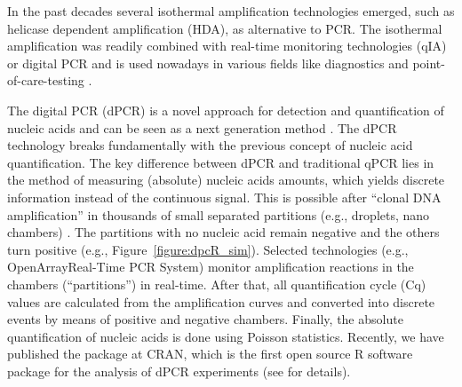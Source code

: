 In the past decades several isothermal amplification technologies emerged, such 
as helicase dependent amplification (HDA), as alternative to PCR. The isothermal 
amplification was readily combined with real-time monitoring technologies (qIA) 
or digital PCR and is used nowadays in various fields like diagnostics and 
point-of-care-testing \citep{selck_2013, rodiger_nucleic_2014, nixon_2014}.

The digital PCR (dPCR) is a novel approach for detection and quantification of 
nucleic acids and can be seen as a next generation method 
\citep{huggett_qpcr_2015}. The dPCR technology breaks fundamentally with the 
previous concept of nucleic acid quantification. The key difference between dPCR 
and traditional qPCR lies in the method of measuring (absolute) nucleic acids 
amounts, which yields discrete information instead of the continuous signal. 
This is possible after ``clonal DNA amplification'' in thousands of small 
separated partitions (e.g., droplets, nano chambers) \citep{huggett_2013, 
milbury_2014, morley_2014}. The partitions with no nucleic acid remain negative 
and the others turn positive (e.g., Figure~\ref{figure:dpcR_sim}). Selected 
technologies (e.g., OpenArray\textregistered Real-Time PCR System) monitor 
amplification reactions in the chambers (``partitions'') in real-time. After 
that, all quantification cycle (Cq) values are calculated from the amplification 
curves and converted into discrete events by means of positive and negative 
chambers. Finally, the absolute quantification of nucleic acids is done using 
Poisson statistics. Recently, we have published the  package at 
CRAN, which is the first open source R software package for the analysis of dPCR 
experiments (see  for details).

